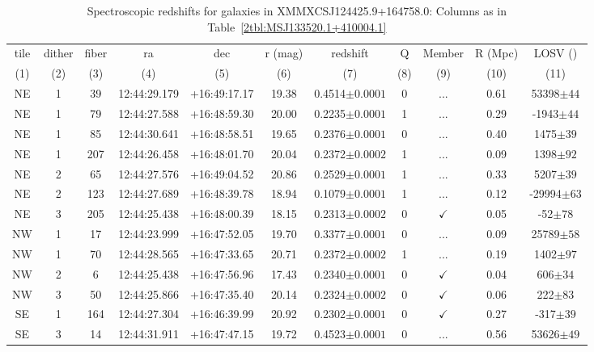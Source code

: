 \begin{landscape}
	\begin{table}
		\centering 
		\caption[Spectroscopic redshifts for galaxies in XMMXCSJ124425.9+164758.0.]{Spectroscopic redshifts for galaxies in XMMXCSJ124425.9+164758.0: Columns as in Table~\ref{2tbl:MSJ133520.1+410004.1}}
		\begin{tabular}{ccccccccccc}
			\hline
			tile & dither & fiber & ra & dec & r (mag) & redshift & Q & Member & R (Mpc) & LOSV (\kms) \\
			(1) & (2) & (3) & (4) & (5) & (6) & (7) & (8) & (9) & (10) & (11) \\
			\hline \hline
	NE & 1 & 39 & 12:44:29.179 & +16:49:17.17 & 19.38 & 0.4514$\pm{0.0001}$ & 0 & ... & 0.61 & 53398$\pm{44}$ \\
	NE & 1 & 79 & 12:44:27.588 & +16:48:59.30 & 20.00 & 0.2235$\pm{0.0001}$ & 1 & ... & 0.29 & -1943$\pm{44}$ \\
	NE & 1 & 85 & 12:44:30.641 & +16:48:58.51 & 19.65 & 0.2376$\pm{0.0001}$ & 0 & ... & 0.40 & 1475$\pm{39}$ \\
	NE & 1 & 207 & 12:44:26.458 & +16:48:01.70 & 20.04 & 0.2372$\pm{0.0002}$ & 1 & ... & 0.09 & 1398$\pm{92}$ \\
	NE & 2 & 65 & 12:44:27.576 & +16:49:04.52 & 20.86 & 0.2529$\pm{0.0001}$ & 1 & ... & 0.33 & 5207$\pm{39}$ \\
	NE & 2 & 123 & 12:44:27.689 & +16:48:39.78 & 18.94 & 0.1079$\pm{0.0001}$ & 1 & ... & 0.12 & -29994$\pm{63}$ \\
	NE & 3 & 205 & 12:44:25.438 & +16:48:00.39 & 18.15 & 0.2313$\pm{0.0002}$ & 0 & $\checkmark$ & 0.05 & -52$\pm{78}$ \\
	NW & 1 & 17 & 12:44:23.999 & +16:47:52.05 & 19.70 & 0.3377$\pm{0.0001}$ & 0 & ... & 0.09 & 25789$\pm{58}$ \\
	NW & 1 & 70 & 12:44:28.565 & +16:47:33.65 & 20.71 & 0.2372$\pm{0.0002}$ & 1 & ... & 0.19 & 1402$\pm{97}$ \\
	NW & 2 & 6 & 12:44:25.438 & +16:47:56.96 & 17.43 & 0.2340$\pm{0.0001}$ & 0 & $\checkmark$ & 0.04 & 606$\pm{34}$ \\
	NW & 3 & 50 & 12:44:25.866 & +16:47:35.40 & 20.14 & 0.2324$\pm{0.0002}$ & 0 & $\checkmark$ & 0.06 & 222$\pm{83}$ \\
	SE & 1 & 164 & 12:44:27.304 & +16:46:39.99 & 20.92 & 0.2302$\pm{0.0001}$ & 0 & $\checkmark$ & 0.27 & -317$\pm{39}$ \\
	SE & 3 & 14 & 12:44:31.911 & +16:47:47.15 & 19.72 & 0.4523$\pm{0.0001}$ & 0 & ... & 0.56 & 53626$\pm{49}$ \\

\end{tabular}
\end{table}
\end{landscape}
